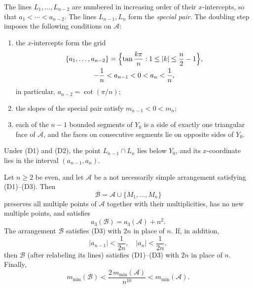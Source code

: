 The lines $L_1,\ldots,L_{n-2}$ are numbered in increasing order of their $x$-intercepts, so that $a_1<\cdots<a_{n-2}$. The lines $L_{n-1},L_n$ form the \emph{special pair}.
The doubling step imposes the following conditions on $\mathcal A$:
\begin{enumerate}[label=\textup{(D\arabic*)}]
\item the $x$-intercepts form the grid
\begin{equation}\label{eq:x-grid}
\begin{gathered}
\{a_1,\ldots,a_{n-2}\}
=\Bigl\{\tan\frac{k\pi}{n}:1\le |k|\le\frac n2-1\Bigr\},
\\
-\frac1n<a_{n-1}<0<a_n<\frac1n,
\end{gathered}
\end{equation}
in particular, $a_{n-2}=\cot(\pi/n)$;
\item the slopes of the special pair satisfy $m_{n-1}<0<m_n$;
\item each of the $n-1$ bounded segments of $Y_0$ is a side of exactly one triangular face of $\mathcal A$, and the faces on consecutive segments lie on opposite sides of $Y_0$.
\end{enumerate}
Under (D1) and (D2), the point $L_{n-1}\cap L_n$ lies below $Y_0$, and its $x$-coordinate lies in the interval $(a_{n-1},a_n)$.

\begin{lemma}\label{lem:doubling}
Let $n\ge2$ be even, and let $\mathcal A$ be a not necessarily simple arrangement satisfying \textup{(D1)--(D3)}. Then
\[
\mathcal B=\mathcal A\cup\{M_1,\ldots,M_n\}
\]
preserves all multiple points of $\mathcal A$ together with their multiplicities, has no new multiple points, and satisfies
\[
a_3(\mathcal B)=a_3(\mathcal A)+n^2.
\]
The arrangement $\mathcal B$ satisfies \textup{(D3)} with $2n$ in place of $n$. If, in addition,
\begin{equation}\label{eq:special-slopes}
|a_{n-1}|<\frac1{2n},\quad |a_n|<\frac1{2n},
\end{equation}
then $\mathcal B$ (after relabeling its lines) satisfies \textup{(D1)--(D3)} with $2n$ in place of $n$.
Finally,
\begin{equation}\label{eq:m-min}
m_{\min}(\mathcal B)<\frac{2\,m_{\min}(\mathcal A)}{n^{10}}<m_{\min}(\mathcal A).
\end{equation}
\end{lemma}

